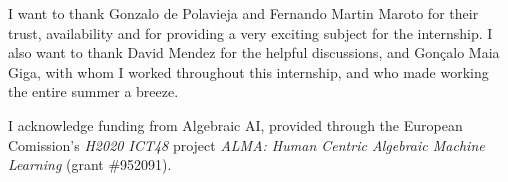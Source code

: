 \begin{dedication}
  I want to thank Gonzalo de Polavieja and Fernando Martin Maroto for their
  trust, availability and for providing a very exciting subject for the
  internship. I also want to thank David Mendez for the helpful discussions, and
  Gonçalo Maia Giga, with whom I worked throughout this internship, and who made
  working the entire summer a breeze.

  \vspace{7pt}

  I acknowledge funding from Algebraic AI, provided through the European
  Comission's \textit{H2020 ICT48} project \textit{ALMA: Human Centric Algebraic
    Machine Learning} (grant \#952091).
\end{dedication}
